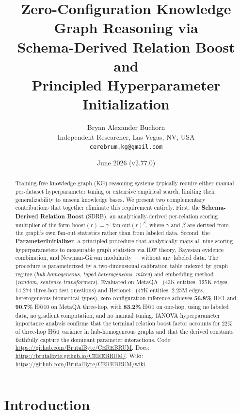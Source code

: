 \documentclass[11pt,a4paper]{article}
\title{\textbf{Zero-Configuration Knowledge Graph Reasoning via\\
Schema-Derived Relation Boost and\\
Principled Hyperparameter Initialization}}
\author{
  Bryan Alexander Buchorn \\
  Independent Researcher, Las Vegas, NV, USA \\
  \texttt{cerebrum.kg@gmail.com}
}
\date{June 2026 \quad (v2.77.0)}
\begin{document}
\maketitle

\begin{abstract}
Training-free knowledge graph (KG) reasoning systems typically require either
manual per-dataset hyperparameter tuning or extensive empirical search, limiting
their generalizability to unseen knowledge bases.
We present two complementary contributions that together eliminate this
requirement entirely.
First, the \textbf{Schema-Derived Relation Boost} (SDRB), an analytically-derived
per-relation scoring multiplier of the form
$\text{boost}(r) = \gamma \cdot \text{fan\_out}(r)^{\beta}$,
where $\gamma$ and $\beta$ are derived from the graph's own fan-out statistics
rather than from labeled data.
Second, the \textbf{ParameterInitializer}, a principled procedure that
analytically maps all nine scoring hyperparameters to measurable graph
statistics via IDF theory, Bayesian evidence combination, and
Newman-Girvan modularity — without any labeled data.
The procedure is parameterized by a two-dimensional calibration table
indexed by graph regime (\textit{hub-homogeneous}, \textit{typed-heterogeneous},
\textit{mixed}) and embedding method (\textit{random}, \textit{sentence-transformers}).
Evaluated on MetaQA~\cite{zhang2018variational} (43K entities, 125K edges,
14,274 three-hop test questions) and Hetionet~\cite{himmelstein2017systematic}
(47K entities, 2.25M edges, heterogeneous biomedical types),
zero-configuration inference achieves \textbf{56.8\%} H@1 and \textbf{90.7\%} H@10
on MetaQA three-hop, with \textbf{83.2\%} H@1 on one-hop, using no labeled data,
no gradient computation, and no manual tuning.
fANOVA hyperparameter importance analysis confirms that the terminal relation
boost factor accounts for 22\% of three-hop H@1 variance in hub-homogeneous
graphs and that the derived constants faithfully capture the dominant
parameter interactions.
Code: \url{https://github.com/BrutalByte/CEREBRUM}.
Docs: \url{https://brutalbyte.github.io/CEREBRUM/}.
Wiki: \url{https://github.com/BrutalByte/CEREBRUM/wiki}.
\end{abstract}

\section{Introduction}
\label{sec:intro}
\end{document}
